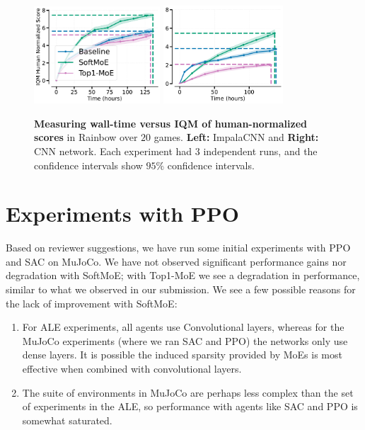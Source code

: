 \begin{figure}[!h]
    \centering
    \includegraphics[width=0.42\textwidth]{figures/MoesTimeRainbowImpala200M.pdf}%
    \includegraphics[width=0.4\textwidth]{figures/MoesTimeRainbowCNN200M.pdf}%
    \caption{\textbf{Measuring wall-time versus IQM of human-normalized scores} in Rainbow over $20$ games. \textbf{Left:} ImpalaCNN and \textbf{Right:} CNN network. Each experiment had $3$ independent runs, and the confidence intervals show $95\%$ confidence intervals.}
\end{figure}

\newpage
\clearpage
\section{Experiments with PPO}

Based on reviewer suggestions, we have run some initial experiments with PPO and SAC on MuJoCo. We have not observed significant performance gains nor degradation with SoftMoE; with Top1-MoE we see a degradation in performance, similar to what we observed in our submission. We see a few possible reasons for the lack of improvement with SoftMoE:

\begin{enumerate}
    \item For ALE experiments, all agents use Convolutional layers, whereas for the MuJoCo experiments (where we ran SAC and PPO) the networks only use dense layers. It is possible the induced sparsity provided by MoEs is most effective when combined with convolutional layers.
    \item The suite of environments in MuJoCo are perhaps less complex than the set of experiments in the ALE, so performance with agents like SAC and PPO is somewhat saturated.
\end{enumerate}

